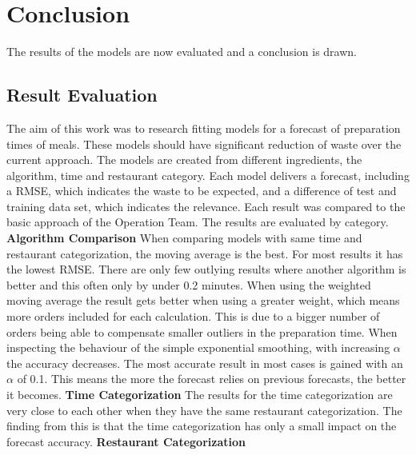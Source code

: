 \chapter{Conclusion}\label{chapter:Conclusion}
The results of the models are now evaluated and a conclusion is drawn.
\section{Result Evaluation}
The aim of this work was to research fitting models for a forecast of preparation times of meals. These models should have significant reduction of waste over the current approach.\newline
The models are created from different ingredients, the algorithm, time and restaurant category. Each model delivers a forecast, including a RMSE, which indicates the waste to be expected, and a difference of test and training data set, which indicates the relevance. Each result was compared to the basic approach of the Operation Team.\newline
The results are evaluated by category.\newline
\newline\textbf{Algorithm Comparison}\newline
When comparing models with same time and restaurant categorization, the moving average is the best. For most results it has the lowest RMSE. There are only few outlying results where another algorithm is better and this often only by under 0.2 minutes.\newline
When using the weighted moving average the result gets better when using a greater weight, which means more orders included for each calculation. This is due to a bigger number of orders being able to compensate smaller outliers in the preparation time.\newline
When inspecting the behaviour of the simple exponential smoothing, with increasing $\alpha$ the accuracy decreases. The most accurate result in most cases is gained with an $\alpha$ of 0.1. This means the more the forecast relies on previous forecasts, the better it becomes.
\newline\textbf{Time Categorization}\newline
The results for the time categorization are very close to each other when they have the same restaurant categorization. The finding from this is that the time categorization has only a small impact on the forecast accuracy.
\newline\textbf{Restaurant Categorization}\newline
